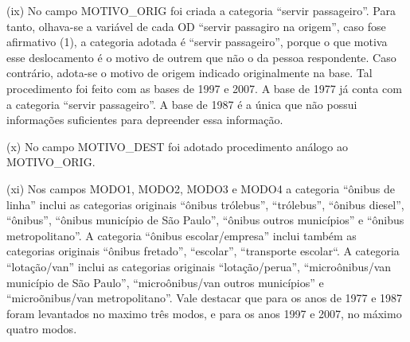 \begin{compactitem}[]
\item(ix) No campo MOTIVO_ORIG foi criada a categoria ``servir passageiro''. Para tanto, olhava-se a variável de cada OD ``servir passagiro na origem'', caso fose afirmativo (1), a categoria adotada é ``servir passageiro'', porque o que motiva esse deslocamento é o motivo de outrem que não o da pessoa respondente. Caso contrário, adota-se o motivo de origem indicado originalmente na base. Tal procedimento foi feito com as bases de 1997 e 2007. A base de 1977 já conta com a categoria ``servir passageiro''. A base de 1987 é a única que não possui informações suficientes para depreender essa informação.
\item(x) No campo MOTIVO_DEST foi adotado procedimento análogo ao MOTIVO_ORIG.
\item (xi) Nos campos MODO1, MODO2, MODO3 e MODO4 a categoria ``ônibus de linha'' inclui as categorias originais ``ônibus trólebus'', ``trólebus'', ``ônibus diesel'', ``ônibus'', ``ônibus município de São Paulo'', ``ônibus outros municípios'' e ``ônibus metropolitano''. A categoria ``ônibus escolar/empresa'' inclui também as categorias originais ``ônibus fretado'', ``escolar'', ``transporte escolar``. A categoria ``lotação/van'' inclui as categorias originais ``lotação/perua'', ``microônibus/van município de São Paulo'', ``microônibus/van outros municípios'' e ``microõnibus/van metropolitano''. Vale destacar que para os anos de 1977 e 1987 foram levantados no maximo três modos, e para os anos 1997 e 2007, no máximo quatro modos.
\end{compactitem}

